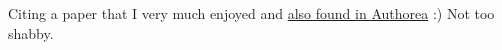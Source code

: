 \cite{2014PLSCB..10E3542G} Citing a paper that I very much enjoyed and \href{https://www.authorea.com/users/3/articles/3410/_show_article}{also found in Authorea} :) Not too shabby.


    
    
